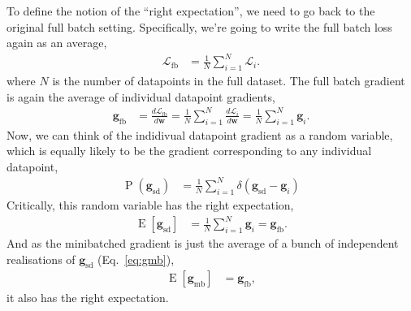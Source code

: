\documentclass{article}
\newcommand{\dt}[2][]{\frac{d #1}{d #2}}
\newcommand{\dLi}{\dt[{\Li}]}
\newcommand{\dLfb}{\dt[{\Lfb}]}
\newcommand{\bracket}[3]{\left#1 #3 \right#2}
\newcommand{\sqb}{\bracket{[}{]}}
\renewcommand{\b}{\bracket{(}{)}}
\newcommand{\0}{\mathbf{0}}
\newcommand{\g}{\mathbf{g}}
\newcommand{\gfb}{\g_\text{fb}}
\newcommand{\gmb}{\g_\text{mb}}
\newcommand{\gsd}{\g_\text{sd}}
\renewcommand{\P}{\operatorname{P}\b}
\newcommand{\w}{\mathbf{w}}
\renewcommand{\L}{\mathcal{L}}
\newcommand{\Li}{\L_i}
\newcommand{\Lfb}{\L_\text{fb}}
\newcommand{\E}{\operatorname{E}\sqb}
\newcommand{\fbsize}{N}
\newcommand{\fbavg}{\tfrac{1}{\fbsize} \sum_{i=1}^{\fbsize}}
\begin{document}
To define the notion of the ``right expectation'', we need to go back to the original full batch setting.
Specifically, we're going to write the full batch loss again as an average,
\begin{align}
  \Lfb &= \fbavg \Li.
\end{align}
where $N$ is the number of datapoints in the full dataset.
The full batch gradient is again the average of individual datapoint gradients,
\begin{align}
  \gfb &= \dLfb{\w} = \fbavg \dLi{\w} = \fbavg \g_i.
\end{align}
Now, we can think of the indidivual datapoint gradient as a random variable, which is equally likely to be the gradient corresponding to any individual datapoint,
\begin{align}
  \P{\gsd} &= \fbavg \delta(\gsd - \g_i)
\end{align}
Critically, this random variable has the right expectation,
\begin{align}
  \E{\gsd} &= \fbavg \g_i = \gfb.
\end{align}
And as the minibatched gradient is just the average of a bunch of independent realisations of $\gsd$ (Eq.~\ref{eq:gmb}),
\begin{align}
  \E{\gmb} &= \gfb,
\end{align}
it also has the right expectation.
\end{document}
